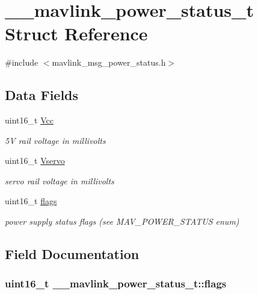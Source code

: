 \hypertarget{struct____mavlink__power__status__t}{\section{\+\_\+\+\_\+mavlink\+\_\+power\+\_\+status\+\_\+t Struct Reference}
\label{struct____mavlink__power__status__t}
}


{\ttfamily \#include $<$mavlink\+\_\+msg\+\_\+power\+\_\+status.\+h$>$}

\subsection*{Data Fields}
\begin{DoxyCompactItemize}
\item 
uint16\+\_\+t \hyperlink{struct____mavlink__power__status__t_a98735761e8f17e7b2bc362a2aaea4b11}{Vcc}
\begin{DoxyCompactList}\small\item\em 5\+V rail voltage in millivolts \end{DoxyCompactList}\item 
uint16\+\_\+t \hyperlink{struct____mavlink__power__status__t_a436f6c452d819c074f8153019d210e08}{Vservo}
\begin{DoxyCompactList}\small\item\em servo rail voltage in millivolts \end{DoxyCompactList}\item 
uint16\+\_\+t \hyperlink{struct____mavlink__power__status__t_a08facc1aa05f500484f4ffcfeafa6654}{flags}
\begin{DoxyCompactList}\small\item\em power supply status flags (see M\+A\+V\+\_\+\+P\+O\+W\+E\+R\+\_\+\+S\+T\+A\+T\+U\+S enum) \end{DoxyCompactList}\end{DoxyCompactItemize}


\subsection{Field Documentation}
\hypertarget{struct____mavlink__power__status__t_a08facc1aa05f500484f4ffcfeafa6654}{
\subsubsection[{flags}]{\setlength{\rightskip}{0pt plus 5cm}uint16\+\_\+t \+\_\+\+\_\+mavlink\+\_\+power\+\_\+status\+\_\+t\+::flags}}\label{struct____mavlink__power__status__t_a08facc1aa05f500484f4ffcfeafa6654}


